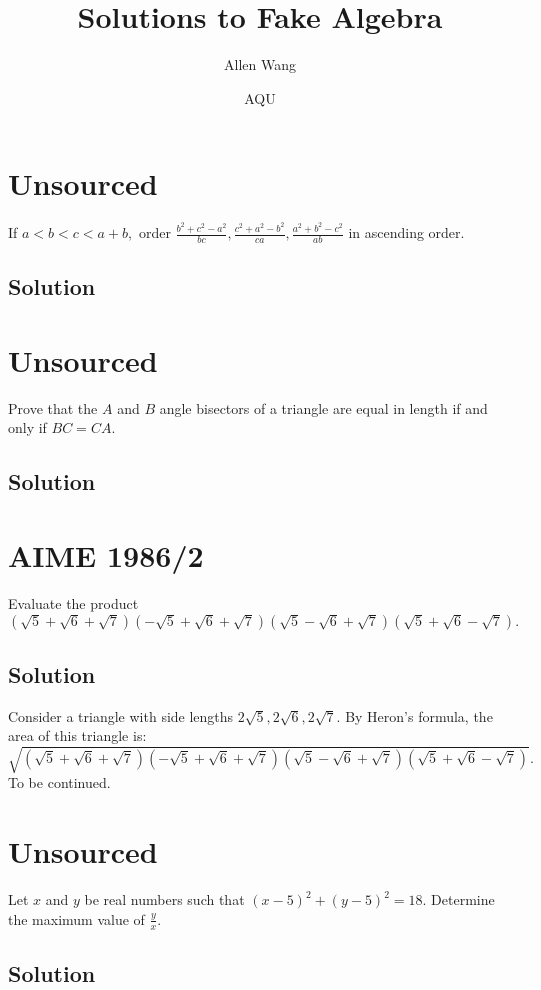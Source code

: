 \documentclass{article}
\title{Solutions to Fake Algebra}
\author{Allen Wang}
\date{AQU}
\begin{document}
\maketitle

\toc

\pagebreak\section{Unsourced}

If $a<b<c<a+b,$ order $\frac{b^2+c^2-a^2}{bc},\frac{c^2+a^2-b^2}{ca},\frac{a^2+b^2-c^2}{ab}$ in ascending order.

\subsection{Solution}

\pagebreak\section{Unsourced}
Prove that the $A$ and $B$ angle bisectors of a triangle are equal in length if and only if $BC=CA.$

\subsection{Solution}

\pagebreak\section{AIME 1986/2}
Evaluate the product $(\sqrt 5+\sqrt6+\sqrt7)(-\sqrt 5+\sqrt6+\sqrt7)(\sqrt 5-\sqrt6+\sqrt7)(\sqrt 5+\sqrt6-\sqrt7).$

\subsection{Solution}
Consider a triangle with side lengths $2\sqrt{5},2\sqrt{6},2\sqrt{7}$. By Heron's formula, the area of this triangle is:
$$\sqrt{(\sqrt 5+\sqrt6+\sqrt7)(-\sqrt 5+\sqrt6+\sqrt7)(\sqrt 5-\sqrt6+\sqrt7)(\sqrt 5+\sqrt6-\sqrt7)}.$$
To be continued.

\pagebreak\section{Unsourced}
Let $x$ and $y$ be real numbers such that $(x - 5)^2 + (y - 5)^2 = 18.$ Determine the maximum value of $\frac{y}{x}.$

\subsection{Solution}
\end{document}
